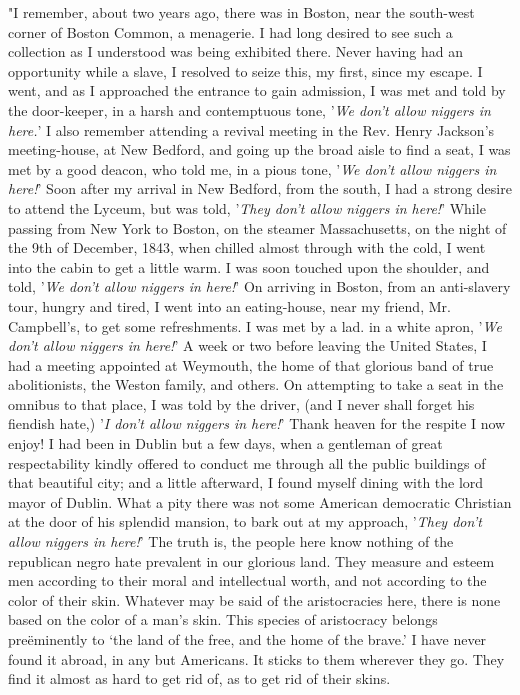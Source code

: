"I remember, about two years ago, there was in Boston, near the
south-west corner of Boston Common, a menagerie. I had long desired to
see such a collection as I understood was being exhibited there. Never
having had an opportunity while a slave, I resolved to seize this, my
first, since my escape. I went, and as I approached the entrance to gain
admission, I was met and told by the door-keeper, in a harsh and
contemptuous tone, {'}\emph{We don't allow niggers in here.}{'} I also
remember attending a revival meeting in the Rev. Henry Jackson's
meeting-house, at New Bedford, and going up the broad aisle to find a
seat, I was met by a good deacon, who told me, in a pious tone,
{'}\emph{We don't allow niggers in here!}{'} Soon after my arrival in
New Bedford, from the south, I had a strong {}desire to attend the
Lyceum, but was told, {'}\emph{They don't allow niggers in here!}{'}
While passing from New York to Boston, on the steamer Massachusetts, on
the night of the 9th of December, 1843, when chilled almost through with
the cold, I went into the cabin to get a little warm. I was soon touched
upon the shoulder, and told, {'}\emph{We don't allow niggers in
here!}{'} On arriving in Boston, from an anti-slavery tour, hungry and
tired, I went into an eating-house, near my friend, Mr. Campbell's, to
get some refreshments. I was met by a lad. in a white apron, {'}\emph{We
don't allow niggers in here!}{'} A week or two before leaving the United
States, I had a meeting appointed at Weymouth, the home of that glorious
band of true abolitionists, the Weston family, and others. On attempting
to take a seat in the omnibus to that place, I was told by the driver,
(and I never shall forget his fiendish hate,) {'}\emph{I don't allow
niggers in here!}{'} Thank heaven for the respite I now enjoy! I had
been in Dublin but a few days, when a gentleman of great respectability
kindly offered to conduct me through all the public buildings of that
beautiful city; and a little afterward, I found myself dining with the
lord mayor of Dublin. What a pity there was not some American democratic
Christian at the door of his splendid mansion, to bark out at my
approach, {'}\emph{They don't allow niggers in here!}{'} The truth is,
the people here know nothing of the republican negro hate prevalent in
our glorious land. They measure and esteem men according to their moral
and intellectual worth, and not according to the color of their skin.
Whatever may be said of the aristocracies here, there is none based on
the color of a man's skin. This species of aristocracy belongs
preëminently to `the land of the free, and the home of the brave.' I
have never found it abroad, in any but Americans. It sticks to them
wherever they go. They find it almost as hard to get rid of, as to get
rid of their skins.

